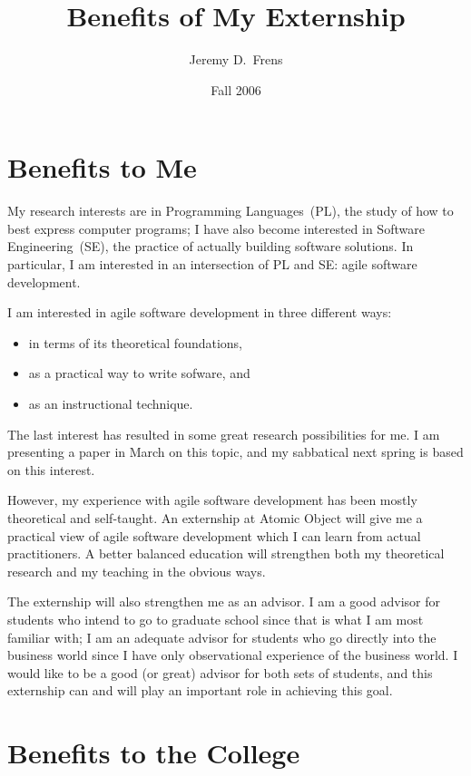 \documentclass{article}
\title{Benefits of My Externship}
\author{Jeremy D.\ Frens}
\date{Fall 2006}
\begin{document}
\maketitle

\thispagestyle{empty}

\section*{Benefits to Me}

My research interests are in Programming Languages~(PL), the study of how to best express computer programs; I have also become interested in Software Engineering~(SE), the practice of actually building software solutions.  In particular, I am interested in an intersection of PL and SE: agile software development.

I am interested in agile software development in three different ways:
  \begin{itemize}
  \item in terms of its theoretical foundations,
  \item as a practical way to write sofware, and
  \item as an instructional technique.
  \end{itemize}
The last interest has resulted in some great research possibilities for me.  I am presenting a paper in March on this topic, and my sabbatical next spring is based on this interest.

However, my experience with agile software development has been mostly theoretical and self-taught.  An externship at Atomic Object will give me a practical view of agile software development which I can learn from actual practitioners.  A better balanced education will strengthen both my theoretical research and my teaching in the obvious ways.

The externship will also strengthen me as an advisor.  I am a good advisor for students who intend to go to graduate school since that is what I am most familiar with; I am an adequate advisor for students who go directly into the business world since I have only observational experience of the business world.  I would like to be a good (or great) advisor for both sets of students, and this externship can and will play an important role in achieving this goal.

\section*{Benefits to the College}
\end{document}
